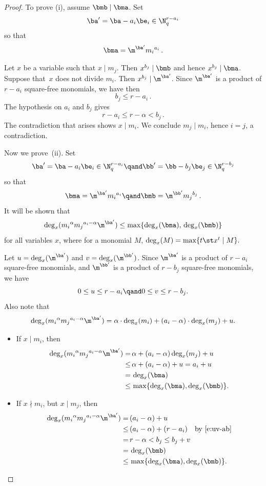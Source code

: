 \begin{proof} To prove \textup{(}i\textup{)}, 
assume $\bmb\mid \bma$. Set
$$
\ba'=\ba-a_i\be_i\in \N^{r-a_i}_q
$$
so that $$\bma=\m^{\ba'}{m_i}^{a_i}\,. $$

Let $x$ be a variable such that  $x\mid m_j$. Then $x^{b_j} \mid \bmb$ and hence $x^{b_j}\mid \bma$.  Suppose that~$x$ does not divide $m_i$. Then $x^{b_j}\mid\m^{\ba'}$. Since $\m^{\ba'}$ is a product of $r-a_i$ square-free monomials, we have then 
$$
b_j\le r-a_i\,.
$$
The hypothesis on $a_i$ and $b_j$ gives 
$$r-a_i\le r-\alpha< b_j\,.$$
The  contradiction that arises shows $x\mid m_i$. 
 We conclude $m_j\mid m_i$, hence $i=j$, a contradiction. 

 Now we prove~\textup{(}ii\textup{)}. 
Set 
$$ \ba'=\ba-a_i\be_i\in \N^{r-a_i}_q \qand \bb'=\bb-b_j\be_j\in
\N^{r-b_j}_q
$$
so that $$\bma=\m^{\ba'}{m_i}^{a_i}\qand \bmb=\m^{\bb'}{m_j}^{b_j}\,.$$
  It
  will be shown that 
$$\deg_x({m_i}^{\alpha}{m_j}^{a_i-\alpha}\m^{\ba'}) \leq \max\{ \deg_x(\bma), \,
  \deg_x(\bmb)\}$$ for all variables $x$, where for a monomial $M$, $\deg_x(M) = \max\{t
  \st x^t \mid M\}.$
    
Let $u = \deg_x(\m^{\ba'})$ and  $v=\deg_x(\m^{\bb'})$.  Since  $\m^{\ba'}$ is a product of $r-a_i$ square-free monomials, and $\m^{\bb'}$ is a product of $r-b_j$ square-free monomials, we have 
\begin{equation}\label{e:uv-ab}
  0 \le u \le r-a_i\qand 0 \le v \le r-b_j.
\end{equation}
Also note that
  $$\deg_x({m_i}^{\alpha}{m_j}^{a_i-\alpha}\m^{\ba'}) = \alpha \cdot \deg_x(m_i)+ (a_i-\alpha)\cdot \deg_x(m_j)+ u.$$

\begin{itemize}
  \item If $x \mid m_i$, then  
    \begin{align*}
      \deg_x({m_i}^{\alpha}{m_j}^{a_i-\alpha}\m^{\ba'}) = & \, \alpha+  (a_i-\alpha)\deg_x(m_j) + u\\
      \leq & \, \alpha+  (a_i-\alpha) + u
      = a_i+u\\
      = & \, \deg_x(\bma) \\
      \leq & \, \max \{ \deg_x(\bma), \deg_x(\bmb) \}.
    \end{align*}

   \item If $x \nmid m_i$, but $x \mid m_j$, then 
     \begin{align*}
     \deg_x({m_i}^{\alpha}{m_j}^{a_i-\alpha}\m^{\ba'}) = & \, (a_i-\alpha) + u\\
      \leq  & \, (a_i-\alpha) + (r-a_i)  \quad \mbox{by \eqref{e:uv-ab}}\\
      = & \, r-\alpha<  b_j \le  b_j+v \\
      = & \, \deg_x(\bmb)\\
      \leq & \, \max \{ \deg_x(\bma), \deg_x(\bmb) \}.
    \end{align*}
  

\end{itemize}
\end{proof}
